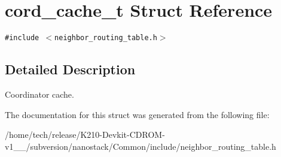 \hypertarget{structcord__cache__t}{
\section{cord\_\-cache\_\-t Struct Reference}
\label{structcord__cache__t}
}
{\tt \#include $<$neighbor\_\-routing\_\-table.h$>$}



\subsection{Detailed Description}
Coordinator cache. 



The documentation for this struct was generated from the following file:\begin{CompactItemize}
\item 
/home/tech/release/K210-Devkit-CDROM-v1\_\_/subversion/nanostack/Common/include/neighbor\_\-routing\_\-table.h\end{CompactItemize}
